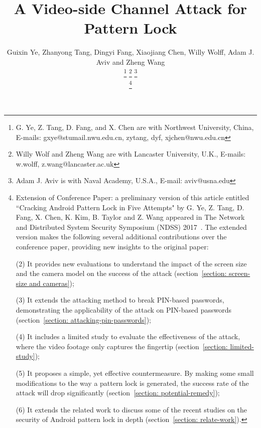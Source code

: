 \documentclass[journal,table,twoside]{IEEEtran}
\begin{document}
\title{A Video-side Channel Attack for Pattern Lock}
\author{Guixin Ye, Zhanyong Tang, Dingyi Fang, Xiaojiang Chen,
        Willy Wolff, Adam J. Aviv and Zheng Wang

    \thanks{G. Ye, Z. Tang, D. Fang, and X. Chen are with Northwest University, China, E-mails: gxye@stumail.nwu.edu.cn, {zytang, dyf, xjchen}@nwu.edu.cn }%
    \thanks{Willy Wolf and Zheng Wang are with Lancaster University, U.K., E-mails: {w.wolff, z.wang}@lancaster.ac.uk}%
    \thanks{Adam J. Aviv is with Naval Academy, U.S.A., E-mail: aviv@usna.edu}

    \thanks{
            Extension of Conference Paper: a preliminary version of this article entitled ``Cracking Android Pattern Lock
            in Five Attempts" by G. Ye, Z. Tang, D. Fang, X. Chen, K. Kim, B. Taylor and Z. Wang appeared in
            The Network and Distributed System Security Symposium (NDSS) 2017~\cite{ye2017cracking}.
            The extended version makes the following several additional contributions over the conference
            paper, providing new insights to the original paper:


            (2)	It provides new evaluations to understand the impact of the screen size and the camera model on the success of the attack (section~\ref{section: screen-size and cameras});

            (3)	It extends the attacking method to break PIN-based passwords, demonstrating the applicability of the attack on PIN-based passwords (section~\ref{section: attacking-pin-passwords});

            (4)	It includes a limited study to evaluate the effectiveness of the attack, where the video footage only captures the fingertip (section~\ref{section: limited-study});

            (5)	It proposes a simple, yet effective countermeasure. By making some small modifications to the way a pattern lock is generated, the success rate of the attack will drop significantly (section~\ref{section: potential-remedy});

            (6)	It extends the related work to discuss some of the recent studies on the security of Android pattern lock in depth (section~\ref{section: relate-work}).

    }
}
\end{document}
